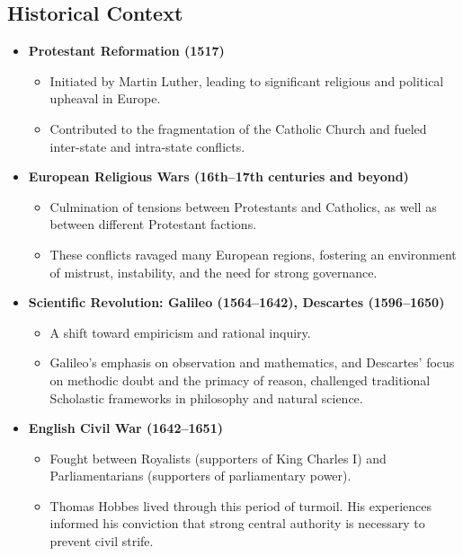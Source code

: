 \vspace{-0.5cm}

    \subsection*{Historical Context}

        \begin{itemize}
          \item \textbf{Protestant Reformation (1517)}
            \begin{itemize}
              \item Initiated by Martin Luther, leading to significant religious and political upheaval in Europe.
              \item Contributed to the fragmentation of the Catholic Church and fueled inter-state and intra-state conflicts.
            \end{itemize}
        
          \item \textbf{European Religious Wars (16th--17th centuries and beyond)}
            \begin{itemize}
              \item Culmination of tensions between Protestants and Catholics, as well as between different Protestant factions.
              \item These conflicts ravaged many European regions, fostering an environment of mistrust, instability, and the need for strong governance.
            \end{itemize}
        
          \item \textbf{Scientific Revolution: Galileo (1564--1642), Descartes (1596--1650)}
            \begin{itemize}
              \item A shift toward empiricism and rational inquiry.
              \item Galileo’s emphasis on observation and mathematics, and Descartes’ focus on methodic doubt and the primacy of reason, challenged traditional Scholastic frameworks in philosophy and natural science.
            \end{itemize}
        
          \item \textbf{English Civil War (1642--1651)}
            \begin{itemize}
              \item Fought between Royalists (supporters of King Charles I) and Parliamentarians (supporters of parliamentary power).
              \item Thomas Hobbes lived through this period of turmoil. His experiences informed his conviction that strong central authority is necessary to prevent civil strife.
            \end{itemize}
        \end{itemize}

